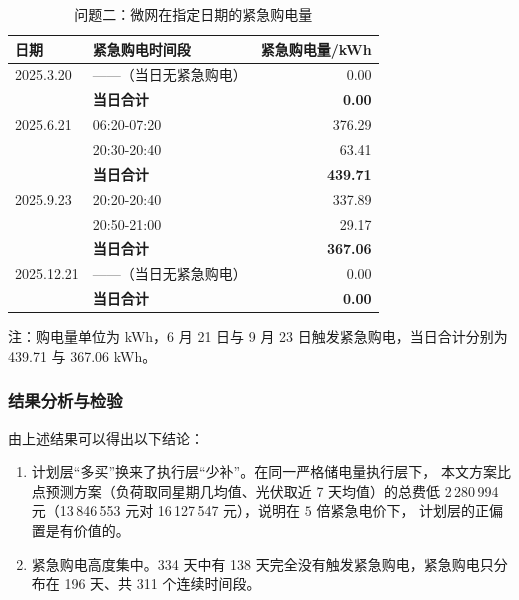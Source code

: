 \documentclass[withoutpreface]{cumcmthesis}
\newcommand{\hd}[1]{\textbf{#1}}
\begin{document}
\begin{table}[!htbp]
  \centering
  \caption{问题二：微网在指定日期的紧急购电量}
  \label{tab:q2t3}
  \begin{tabular}{l l r}
    \toprule[1.5pt]
    \hd{日期} & \hd{紧急购电时间段} & \hd{紧急购电量/kWh}\\
    \midrule[1pt]
    2025.3.20 & ——（当日无紧急购电） & 0.00\\
     & \hd{当日合计} & \hd{0.00}\\
    \midrule[1pt]
    2025.6.21 & 06:20-07:20 & 376.29\\
     & 20:30-20:40 & 63.41\\
     & \hd{当日合计} & \hd{439.71}\\
    \midrule[1pt]
    2025.9.23 & 20:20-20:40 & 337.89\\
     & 20:50-21:00 & 29.17\\
     & \hd{当日合计} & \hd{367.06}\\
    \midrule[1pt]
    2025.12.21 & ——（当日无紧急购电） & 0.00\\
     & \hd{当日合计} & \hd{0.00}\\
    \bottomrule[1.5pt]
  \end{tabular}

  \vspace{2pt}
  \parbox{0.95\textwidth}{ 注：购电量单位为 kWh，6 月 21 日与 9 月 23 日触发紧急购电，当日合计分别为 439.71 与 367.06 kWh。}
\end{table}

\subsubsection{结果分析与检验}
\label{sec:q2lim}

由上述结果可以得出以下结论：

\begin{enumerate}[itemsep=1pt, topsep=2pt]
  \item 计划层“多买”换来了执行层“少补”。在同一严格储电量执行层下，
        本文方案比点预测方案（负荷取同星期几均值、光伏取近 7 天均值）的总费低
        2\,280\,994 元（13\,846\,553 元对 16\,127\,547 元），说明在 $5$ 倍紧急电价下，
        计划层的正偏置是有价值的。
  \item 紧急购电高度集中。334 天中有 138 天完全没有触发紧急购电，紧急购电只分布在
        196 天、共 311 个连续时间段。
\end{enumerate}



\FloatBarrier
\end{document}
